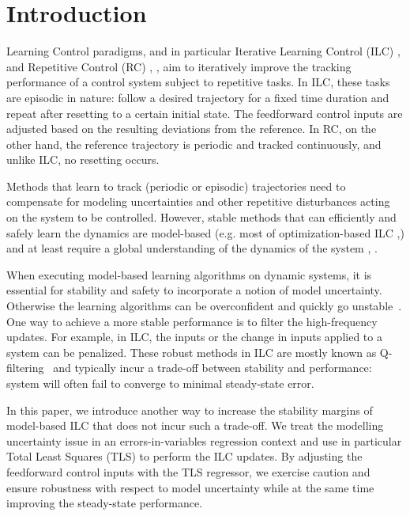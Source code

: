 \section{Introduction}
%
Learning Control paradigms, and in particular Iterative Learning Control (ILC) \cite{Arimoto84}, \cite{Bristow06} and Repetitive Control (RC) \cite{Wang09}, \cite{Longman2000}, aim to iteratively improve the tracking performance of a control system subject to repetitive tasks. In ILC, these tasks are episodic in nature: follow a desired trajectory for a fixed time duration and repeat after resetting to a certain initial state. The feedforward control inputs are adjusted based on the resulting deviations from the reference. In RC, on the other hand, the reference trajectory is periodic and tracked continuously, and unlike ILC, no resetting occurs.

Methods that learn to track (periodic or episodic) trajectories need to compensate for modeling uncertainties and other repetitive disturbances acting on the system to be controlled. However, stable methods that can efficiently and safely learn the dynamics are model-based (e.g. most of optimization-based ILC \cite{Amann95},\cite{Bristow06}) and at least require a global understanding of the dynamics of the system \cite{Kolter09}, \cite{NguyenTuong11}.

When executing model-based learning algorithms on dynamic systems, it is essential for stability and safety to incorporate a notion of model uncertainty. Otherwise the learning algorithms can be overconfident and quickly go unstable~\cite{Longman2000}. One way to achieve a more stable performance is to filter the high-frequency updates. For example, in ILC, the inputs or the change in inputs applied to a system can be penalized. These robust methods in ILC are mostly known as Q-filtering~\cite{Bristow06} and typically incur a trade-off between stability and performance: system will often fail to converge to minimal steady-state error. %

In this paper, we introduce another way to increase the stability margins of model-based ILC that does not incur such a trade-off. We treat the modelling uncertainty issue in an errors-in-variables regression context and use in particular Total Least Squares (TLS) \cite{Golub80} to perform the ILC updates. By adjusting the feedforward control inputs with the TLS regressor, we exercise caution and ensure robustness with respect to model uncertainty while at the same time improving the steady-state performance. 

